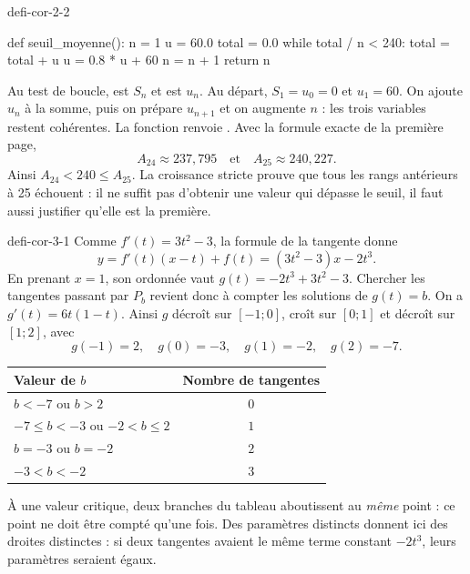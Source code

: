 \begin{blocEdition}{defi-cor-2-2}
\begin{python}
def seuil_moyenne():
    n = 1
    u = 60.0
    total = 0.0
    while total / n < 240:
        total = total + u
        u = 0.8 * u + 60
        n = n + 1
    return n
\end{python}
Au test de boucle,  est $S_n$ et  est $u_n$.
Au départ, $S_1=u_0=0$ et $u_1=60$. On ajoute $u_n$ à la somme,
puis on prépare $u_{n+1}$ et on augmente $n$ : les trois variables restent cohérentes.
La fonction renvoie .
Avec la formule exacte de la première page,
\[A_{24}\approx237{,}795\quad\text{et}\quad A_{25}\approx240{,}227.\]
Ainsi $A_{24}<240\leq A_{25}$. La croissance stricte prouve que tous les rangs
antérieurs à 25 échouent : il ne suffit pas d'obtenir une valeur qui dépasse le seuil,
il faut aussi justifier qu'elle est la première.
\end{blocEdition}

\begin{blocEdition}{defi-cor-3-1}
Comme $f'(t)=3t^2-3$, la formule de la tangente donne
\[y=f'(t)(x-t)+f(t)=(3t^2-3)x-2t^3.\]
En prenant $x=1$, son ordonnée vaut $g(t)=-2t^3+3t^2-3$.
Chercher les tangentes passant par $P_b$ revient donc à compter les solutions de $g(t)=b$.
On a $g'(t)=6t(1-t)$. Ainsi $g$ décroît sur $[-1;0]$, croît sur $[0;1]$
et décroît sur $[1;2]$, avec
\[g(-1)=2,\quad g(0)=-3,\quad g(1)=-2,\quad g(2)=-7.\]
\begin{center}\begin{tabular}{@{}lc@{}}\toprule
Valeur de $b$ & Nombre de tangentes\\\midrule
$b<-7$ ou $b>2$ & $0$\\
$-7\leq b<-3$ ou $-2<b\leq2$ & $1$\\
$b=-3$ ou $b=-2$ & $2$\\
$-3<b<-2$ & $3$\\\bottomrule\end{tabular}\end{center}
À une valeur critique, deux branches du tableau aboutissent au \emph{même} point :
ce point ne doit être compté qu'une fois.
Des paramètres distincts donnent ici des droites distinctes : si deux tangentes avaient
le même terme constant $-2t^3$, leurs paramètres seraient égaux.
\end{blocEdition}


